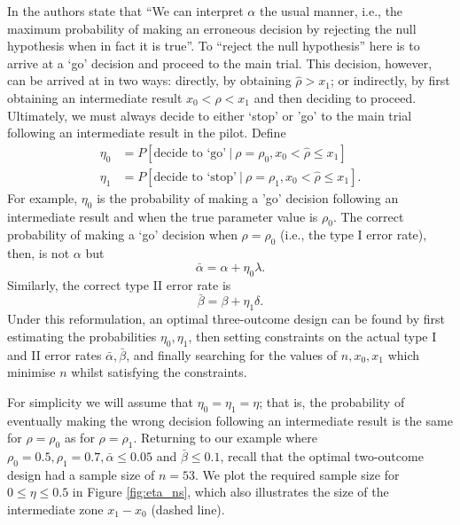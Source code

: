 \documentclass[Crown, times, sagev]{sagej}
\begin{document}
In \cite{Sargent2001} the authors state that ``We  can interpret $\alpha$  the usual  manner,  i.e., the  maximum probability of making an erroneous decision by rejecting the null hypothesis when in fact it is true''. To ``reject the null hypothesis'' here is to arrive at a `go' decision and proceed to the main trial. This decision, however, can be arrived at in two ways: directly, by obtaining $\hat{\rho} > x_1$; or indirectly, by first obtaining an intermediate result $x_0 < \hat{\rho} < x_1$ and then deciding to proceed. Ultimately, we must always decide to either `stop' or 'go' to the main trial following an intermediate result in the pilot. Define
\begin{align}
\eta_0 &= P[\text{decide to `go'} ~|~ \rho = \rho_0, x_0 < \hat{\rho} \leq x_1] \\
\eta_1 &= P[\text{decide to `stop'} ~|~ \rho = \rho_1, x_0 < \hat{\rho} \leq x_1].
\end{align}
For example, $\eta_0$ is the probability of making a 'go' decision following an intermediate result and when the true parameter value is $\rho_0$. The correct probability of making a `go' decision when $\rho = \rho_0$ (i.e., the type I error rate), then, is not $\alpha$ but
$$
\bar{\alpha} = \alpha + \eta_0 \lambda.
$$
Similarly, the correct type II error rate is
$$
\bar{\beta} = \beta + \eta_1 \delta.
$$
Under this reformulation, an optimal three-outcome design can be found by first estimating the probabilities $\eta_0, \eta_1$, then setting constraints on the actual type I and II error rates $\bar{\alpha}, \bar{\beta}$, and finally searching for the values of  $n, x_0, x_1$ which minimise $n$ whilst satisfying the constraints. 

For simplicity we will assume that $\eta_0 = \eta_1 = \eta$; that is, the probability of eventually making the wrong decision following an intermediate result is the same for $\rho = \rho_0$ as for $\rho = \rho_1$. Returning to our example where $\rho_0 = 0.5, \rho_1 = 0.7, \bar{\alpha} \leq 0.05$ and $\bar{\beta} \leq 0.1$, recall that the optimal two-outcome design had a sample size of $n = 53$. We plot the required sample size for $0 \leq \eta \leq 0.5$ in Figure \ref{fig:eta_ns}, which also illustrates the size of the intermediate zone $x_1 - x_0$ (dashed line).
\end{document}
